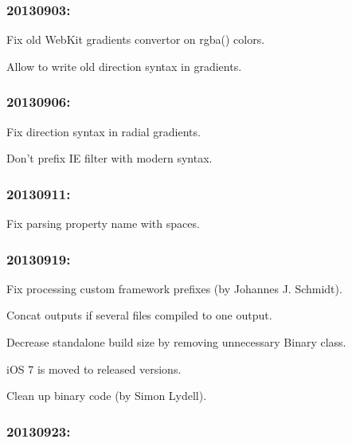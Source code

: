 \subsubsection*{20130903\+:}


\begin{DoxyItemize}
\item Fix old Web\+Kit gradients convertor on rgba() colors.
\item Allow to write old direction syntax in gradients.
\end{DoxyItemize}

\subsubsection*{20130906\+:}


\begin{DoxyItemize}
\item Fix direction syntax in radial gradients.
\item Don’t prefix IE filter with modern syntax.
\end{DoxyItemize}

\subsubsection*{20130911\+:}


\begin{DoxyItemize}
\item Fix parsing property name with spaces.
\end{DoxyItemize}

\subsubsection*{20130919\+:}


\begin{DoxyItemize}
\item Fix processing custom framework prefixes (by Johannes J. Schmidt).
\item Concat outputs if several files compiled to one output.
\item Decrease standalone build size by removing unnecessary Binary class.
\item i\+OS 7 is moved to released versions.
\item Clean up binary code (by Simon Lydell).
\end{DoxyItemize}

\subsubsection*{20130923\+:}


